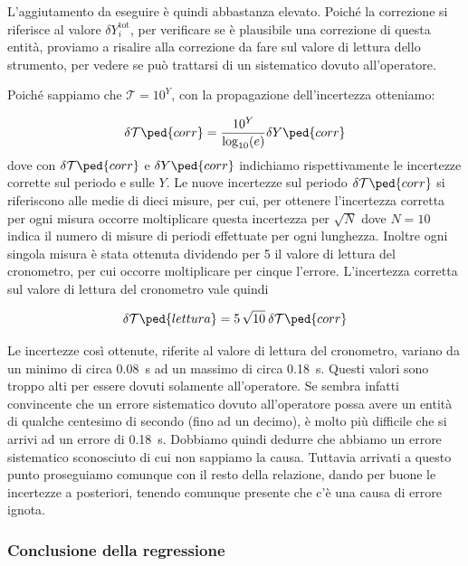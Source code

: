 L'aggiutamento da eseguire è quindi abbastanza elevato. Poiché la correzione si riferisce al valore $\delta Y_i^{\text{tot}}$,
per verificare se è plausibile una correzione di questa entità, proviamo a risalire alla correzione da fare sul valore di lettura
dello strumento, per vedere se può trattarsi di un sistematico dovuto all'operatore.

Poiché sappiamo che $\mathcal{T} = 10^Y$, con la propagazione dell'incertezza otteniamo:

\begin{equation}
    \delta \mathcal{T}\ped{corr} = \frac{10^Y}{\log_{10}(e)} \delta Y\ped{corr}
\end{equation}
%
dove con $\delta \mathcal{T}\ped{corr}$ e $\delta Y\ped{corr}$ indichiamo rispettivamente le incertezze corrette sul periodo e sulle $Y$.
Le nuove incertezze sul periodo $\delta \mathcal{T}\ped{corr}$ si riferiscono alle medie di dieci misure, per cui,
per ottenere l'incertezza corretta per ogni misura occorre moltiplicare questa incertezza per $\sqrt{N}$ dove $N = 10$
indica il numero di misure di periodi effettuate per ogni lunghezza. Inoltre ogni singola misura è stata ottenuta dividendo per 5 il valore
di lettura del cronometro, per cui occorre moltiplicare per cinque l'errore. L'incertezza corretta sul valore di lettura del cronometro
vale quindi

\begin{equation}
    \delta \mathcal{T}\ped{lettura} = 5\, \sqrt{10}\: \delta \mathcal{T}\ped{corr}
\end{equation}

Le incertezze così ottenute, riferite al valore di lettura del cronometro, variano da un minimo di circa \SI{0.08}{\second} ad un massimo
di circa \SI{0.18}{\second}. Questi valori sono troppo alti per essere dovuti solamente all'operatore. Se sembra infatti convincente
che un errore sistematico dovuto all'operatore possa avere un entità di qualche centesimo di secondo (fino ad un decimo), è
molto più difficile che si arrivi ad un errore di \SI{0.18}{\second}. Dobbiamo quindi dedurre che abbiamo un errore sistematico
sconosciuto di cui non sappiamo la causa. Tuttavia arrivati a questo punto proseguiamo comunque con il resto della relazione, dando
per buone le incertezze a posteriori, tenendo comunque presente che c'è una causa di errore ignota.

\subsubsection{Conclusione della regressione}
\label{l_end_fit}

